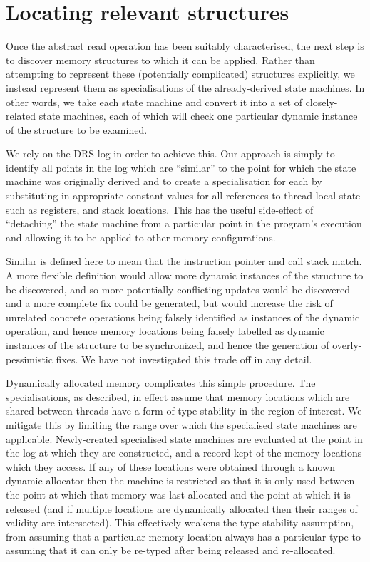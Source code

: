 \documentclass[10pt,letter,twocolumn]{sigplanconf}
\newcommand{\editorial}[1]{}
\begin{document}
\section{Locating relevant structures}

Once the abstract read operation has been suitably characterised, the
next step is to discover memory structures to which it can be applied.
Rather than attempting to represent these (potentially complicated)
structures explicitly, we instead represent them as specialisations of
the already-derived state machines.  In other words, we take each
state machine and convert it into a set of closely-related state
machines, each of which will check one particular dynamic instance of
the structure to be examined.

We rely on the DRS log in order to achieve this.  Our approach is
simply to identify all points in the log which are ``similar'' to the
point for which the state machine was originally derived and to create
a specialisation for each by substituting in appropriate constant
values for all references to thread-local state such as registers, and
stack locations.  This has the useful side-effect of ``detaching'' the
state machine from a particular point in the program's execution and
allowing it to be applied to other memory configurations.

Similar is defined here to mean that the instruction pointer and call
stack match.  A more flexible definition would allow more dynamic
instances of the structure to be discovered, and so more
potentially-conflicting updates would be discovered and a more
complete fix could be generated, but would increase the risk of
unrelated concrete operations being falsely identified as instances of
the dynamic operation, and hence memory locations being falsely
labelled as dynamic instances of the structure to be synchronized, and
hence the generation of overly-pessimistic fixes\editorial{Holly run
  on sentence, Batman.}.  We have not investigated this trade off in
any detail.

Dynamically allocated memory complicates this simple procedure.  The
specialisations, as described, in effect assume that memory locations
which are shared between threads have a form of type-stability in the
region of interest.  We mitigate this by limiting the range over which
the specialised state machines are applicable.  Newly-created
specialised state machines are evaluated at the point in the log at
which they are constructed, and a record kept of the memory locations
which they access.  If any of these locations were obtained through a
known dynamic allocator then the machine is restricted so that it is
only used between the point at which that memory was last allocated
and the point at which it is released (and if multiple locations are
dynamically allocated then their ranges of validity are intersected).
This effectively weakens the type-stability assumption, from assuming
that a particular memory location always has a particular type to
assuming that it can only be re-typed after being released and
re-allocated.\editorial{This isn't right: after specialisation, we
  could still refer to pointers in the heap, and we won't track
  validity of the referenced objects.  Probably doesn't matter in
  practice.}
\end{document}
